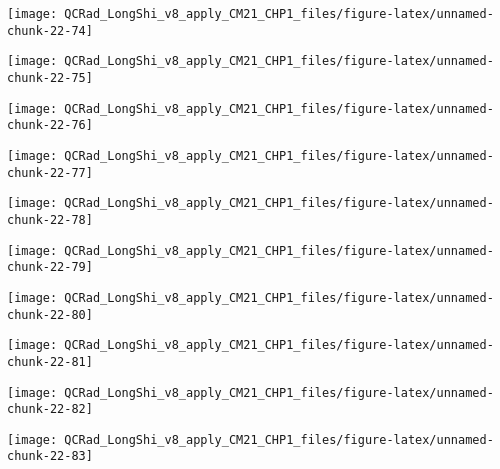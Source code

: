\documentclass[
  10pt,
  a4paper,oneside]{article}
\begin{document}
\begin{center}\texttt{[image: QCRad\_LongShi\_v8\_apply\_CM21\_CHP1\_files/figure-latex/unnamed-chunk-22-74]} \end{center}

\begin{center}\texttt{[image: QCRad\_LongShi\_v8\_apply\_CM21\_CHP1\_files/figure-latex/unnamed-chunk-22-75]} \end{center}

\begin{center}\texttt{[image: QCRad\_LongShi\_v8\_apply\_CM21\_CHP1\_files/figure-latex/unnamed-chunk-22-76]} \end{center}

\begin{center}\texttt{[image: QCRad\_LongShi\_v8\_apply\_CM21\_CHP1\_files/figure-latex/unnamed-chunk-22-77]} \end{center}

\begin{center}\texttt{[image: QCRad\_LongShi\_v8\_apply\_CM21\_CHP1\_files/figure-latex/unnamed-chunk-22-78]} \end{center}

\begin{center}\texttt{[image: QCRad\_LongShi\_v8\_apply\_CM21\_CHP1\_files/figure-latex/unnamed-chunk-22-79]} \end{center}

\begin{center}\texttt{[image: QCRad\_LongShi\_v8\_apply\_CM21\_CHP1\_files/figure-latex/unnamed-chunk-22-80]} \end{center}

\begin{center}\texttt{[image: QCRad\_LongShi\_v8\_apply\_CM21\_CHP1\_files/figure-latex/unnamed-chunk-22-81]} \end{center}

\begin{center}\texttt{[image: QCRad\_LongShi\_v8\_apply\_CM21\_CHP1\_files/figure-latex/unnamed-chunk-22-82]} \end{center}

\begin{center}\texttt{[image: QCRad\_LongShi\_v8\_apply\_CM21\_CHP1\_files/figure-latex/unnamed-chunk-22-83]} \end{center}
\end{document}

